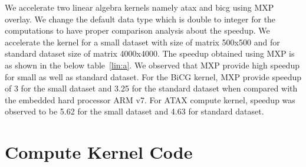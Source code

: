 We accelerate two linear algebra kernels namely atax and bicg using MXP overlay. We change the default data type which is double to integer for the computations to have proper comparison analysis about the speedup. We accelerate the kernel for a small dataset with size of matrix 500x500 and for standard dataset size of matrix 4000x4000. The speedup obtained using MXP is as shown in the below table~\ref{lin:a}. We observed that MXP provide high speedup for small as well as standard dataset. For the BiCG kernel, MXP provide speedup of 3 for the small dataset and 3.25 for the standard dataset when compared with the embedded hard processor ARM v7. For ATAX compute kernel, speedup was observed to be 5.62 for the small dataset and 4.63 for standard dataset.



    
    
%  
%   
%  
%  
  
  
  \section{Compute Kernel Code}
  
